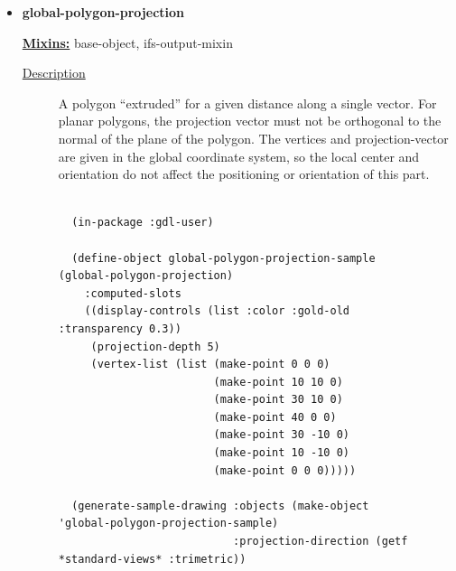 \documentclass [11pt]{book}
\begin{document}
\begin{itemize}
\begin{description}
\end{description}







\item {}
\label{prim:global-polygon-projection}
\textbf{global-polygon-projection}


\textbf{
\underline{Mixins:}} base-object, ifs-output-mixin





\begin{description}

\item [
\underline{Description}]


A polygon ``extruded'' for a given distance along a single vector.
For planar polygons, the projection vector must not be orthogonal to the normal of the plane of
the polygon. The vertices and projection-vector are given in the global coordinate system, so
the local center and orientation do not affect the positioning or orientation of this part.



\end{description}




\begin{figure}
\begin{lrbox}{\boxedverb}
\begin{minipage}{\linewidth}
{\small

\begin{verbatim}

  (in-package :gdl-user)

  (define-object global-polygon-projection-sample (global-polygon-projection)
    :computed-slots
    ((display-controls (list :color :gold-old :transparency 0.3))
     (projection-depth 5)
     (vertex-list (list (make-point 0 0 0)
                        (make-point 10 10 0)
                        (make-point 30 10 0)
                        (make-point 40 0 0)
                        (make-point 30 -10 0)
                        (make-point 10 -10 0)
                        (make-point 0 0 0)))))

  (generate-sample-drawing :objects (make-object 'global-polygon-projection-sample)
                           :projection-direction (getf *standard-views* :trimetric))  

  
\end{verbatim}}
\end{minipage}
\end{lrbox}
\fbox{\usebox{\boxedverb}}


\end{figure}
\end{itemize}
\end{document}
